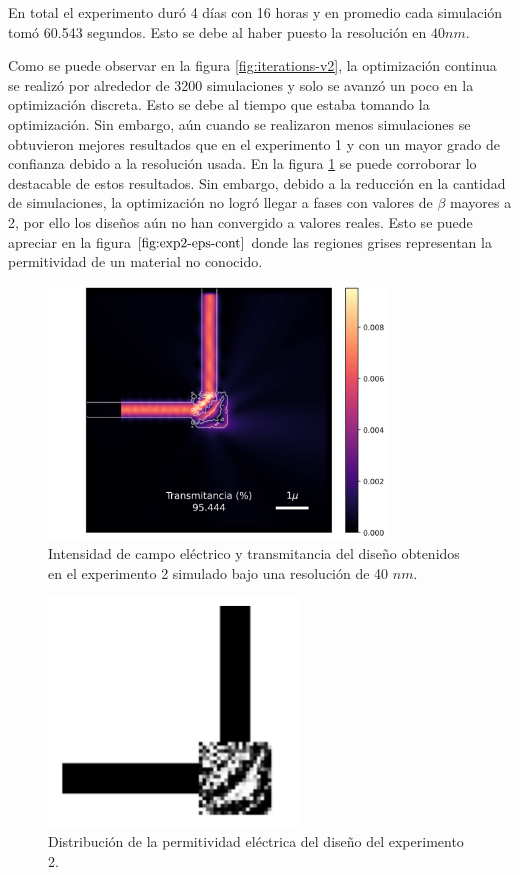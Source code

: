 En total el experimento duró 4 días con 16 horas y en promedio cada simulación tomó 60.543 segundos.
Esto se debe al haber puesto la resolución en $40 nm$.

Como se puede observar en la figura \ref{fig:iterations-v2}, la optimización continua se realizó por alrededor de 3200 simulaciones y solo se avanzó un poco en la optimización discreta. Esto se debe al tiempo que estaba tomando la optimización. 
Sin embargo, aún cuando se realizaron menos simulaciones se obtuvieron mejores resultados que en el experimento 1 y con un mayor grado de confianza debido a la resolución usada.
En la figura \ref{fig:exp2-field-cont} se puede corroborar lo destacable de estos resultados.
Sin embargo, debido a la reducción en la cantidad de simulaciones, la optimización no logró llegar a fases con valores de $\beta$ mayores a 2, por ello los diseños aún no han convergido a valores reales.
Esto se puede apreciar en la figura $\ref{fig:exp2-eps-cont}$ donde las regiones grises representan la permitividad de un material no conocido.

\begin{figure}
  \centering
  \includegraphics[width=0.80\textwidth]{image/results/device-v2-r40-cont.png}
  \caption{Intensidad de campo eléctrico y transmitancia del diseño obtenidos en el experimento 2 simulado bajo una resolución de 40 $nm$.}
  \label{fig:exp2-field-cont}
\end{figure}

\begin{figure}
  \centering
  \includegraphics[width=0.60\textwidth]{image/results/eps-v2-cont.png}
  \caption{Distribución de la permitividad eléctrica del diseño del experimento 2.}
  \label{fig:exp2-eps-cont}
\end{figure}

